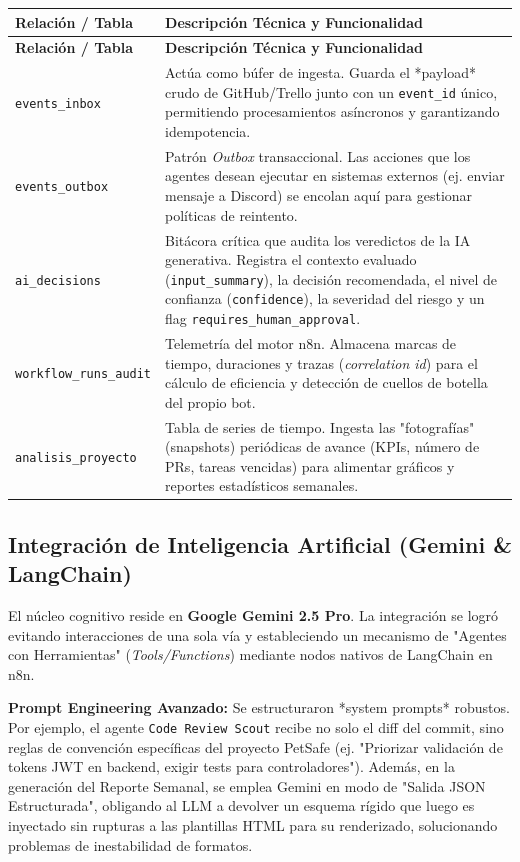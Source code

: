 \documentclass{encabezado}
\begin{document}
\begin{longtable}{P{4cm} P{11cm}}
\toprule
\textbf{Relación / Tabla} & \textbf{Descripción Técnica y Funcionalidad} \\
\midrule
\endfirsthead
\midrule
\textbf{Relación / Tabla} & \textbf{Descripción Técnica y Funcionalidad} \\
\midrule
\endhead
\texttt{events\_inbox} & Actúa como búfer de ingesta. Guarda el *payload* crudo de GitHub/Trello junto con un \texttt{event\_id} único, permitiendo procesamientos asíncronos y garantizando idempotencia. \\
\addlinespace
\texttt{events\_outbox} & Patrón \textit{Outbox} transaccional. Las acciones que los agentes desean ejecutar en sistemas externos (ej. enviar mensaje a Discord) se encolan aquí para gestionar políticas de reintento. \\
\addlinespace
\texttt{ai\_decisions} & Bitácora crítica que audita los veredictos de la IA generativa. Registra el contexto evaluado (\texttt{input\_summary}), la decisión recomendada, el nivel de confianza (\texttt{confidence}), la severidad del riesgo y un flag \texttt{requires\_human\_approval}. \\
\addlinespace
\texttt{workflow\_runs\_audit} & Telemetría del motor n8n. Almacena marcas de tiempo, duraciones y trazas (\textit{correlation id}) para el cálculo de eficiencia y detección de cuellos de botella del propio bot. \\
\addlinespace
\texttt{analisis\_proyecto} & Tabla de series de tiempo. Ingesta las "fotografías" (snapshots) periódicas de avance (KPIs, número de PRs, tareas vencidas) para alimentar gráficos y reportes estadísticos semanales. \\
\bottomrule
\end{longtable}

\subsection{Integración de Inteligencia Artificial (Gemini \& LangChain)}

El núcleo cognitivo reside en \textbf{Google Gemini 2.5 Pro}. La integración se logró evitando interacciones de una sola vía y estableciendo un mecanismo de "Agentes con Herramientas" (\textit{Tools/Functions}) mediante nodos nativos de LangChain en n8n. 

\textbf{Prompt Engineering Avanzado:} Se estructuraron *system prompts* robustos. Por ejemplo, el agente \texttt{Code Review Scout} recibe no solo el diff del commit, sino reglas de convención específicas del proyecto PetSafe (ej. "Priorizar validación de tokens JWT en backend, exigir tests para controladores").
Además, en la generación del Reporte Semanal, se emplea Gemini en modo de "Salida JSON Estructurada", obligando al LLM a devolver un esquema rígido que luego es inyectado sin rupturas a las plantillas HTML para su renderizado, solucionando problemas de inestabilidad de formatos.
\end{document}
